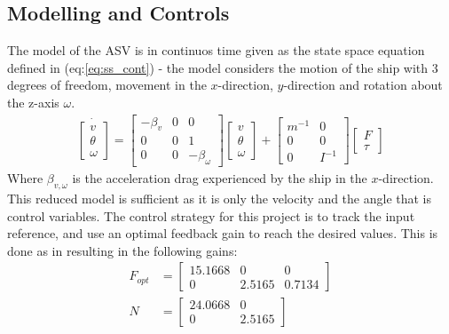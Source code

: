 \documentclass{ifacconf}
\begin{document}
\subsection{Modelling and Controls}
The model of the ASV is in continuos time given as the state space equation defined in (eq:\ref{eq:ss_cont}) - the model considers the motion of the ship with 3 degrees of freedom, movement in the $x$-direction, $y$-direction and rotation about the z-axis $\omega$. 
\begin{align}
\dot{\begin{bmatrix}
v\\
\theta\\
\omega
\end{bmatrix}} = \begin{bmatrix}
-\beta_v & 0 & 0\\
0 & 0 & 1\\
0 & 0 & -\beta_\omega
\end{bmatrix} \begin{bmatrix}
v\\
\theta\\
\omega
\end{bmatrix} + \begin{bmatrix}
m^{-1} & 0\\
0 & 0\\
0 & I^{-1}
\end{bmatrix}\begin{bmatrix}
F\\
\tau
\end{bmatrix}
\label{eq:ss_cont}
\end{align}
Where $\beta_{v,\omega}$ is the acceleration drag experienced by the ship in the $x$-direction. This reduced model is sufficient as it is only the velocity and the angle that is control variables. The control strategy for this project is to track the input reference, and use an optimal feedback gain to reach the desired values. This is done as in \cite{feedback} resulting in the following gains:
\begin{align}
F_{opt} &= \begin{bmatrix}
15.1668 & 0 & 0\\
0 & 2.5165 & 0.7134
\end{bmatrix}\label{eq:fcont}\\
N &=  \begin{bmatrix}
24.0668 & 0\\
0 & 2.5165
\end{bmatrix}\label{eq:ncont}
\end{align}
\end{document}
